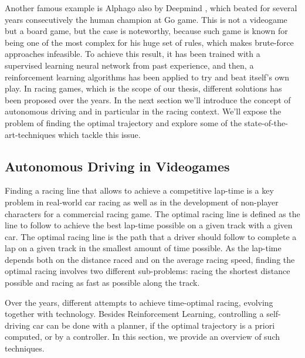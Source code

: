 Another famous example is Alphago also by Deepmind \cite{alphago}, which beated for several years consecutively the human champion at Go game. This is not a videogame but a board game, but the case is noteworthy, because such game is known for being one of the most complex  for his huge set of rules, which makes brute-force approaches infeasible. To achieve this result, it has been trained with a supervised learning neural network from past experience, and then, a reinforcement learning algorithms has been applied to try and beat itself's own play. 
In racing games, which is the scope of our thesis, different solutions has been proposed over the years. In the next section we'll introduce the concept of autonomous driving and in particular in the racing context. We'll expose the problem of finding the optimal trajectory and explore some of the state-of-the-art-techniques which tackle this issue.


\subsection{Autonomous Driving in Videogames}
Finding a racing line that allows to achieve a competitive lap-time is a key problem in real-world car racing as well as in the development of non-player characters for a commercial racing game.
The optimal racing line is defined as the line to follow to achieve the best lap-time possible on a given track with a given car. The optimal racing line is the path that a driver should follow to complete a lap on a given track in the smallest amount of time possible. As the lap-time depends both on the distance raced and on the average racing speed, finding the optimal racing involves two different sub-problems: racing the shortest distance possible and racing as fast as possible along the track.

Over the years, different attempts to achieve time-optimal racing, evolving together with technology. Besides Reinforcement Learning, controlling a self-driving car can be done with a planner, if the optimal trajectory is a priori computed, or by a controller. In this section, we provide an overview of such techniques. 


